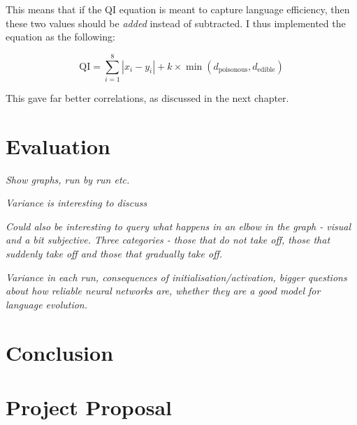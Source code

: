 \documentclass[12pt,a4paper,twoside,openright]{report}
\begin{document}
This means that if the QI equation is meant to capture language efficiency, then these two values should be \emph{added} instead of subtracted. I thus implemented the equation as the following:

\begin{equation}
\label{equation:qibetter}
\mathrm{QI} = \sum^{8}_{i = 1} |x_i - y_i| + k \times \min (d_{\mathrm{poisonous}}, d_{\mathrm{edible}})
\end{equation}

This gave far better correlations, as discussed in the next chapter.


\chapter{Evaluation}

\emph{Show graphs, run by run etc.}

\emph{Variance is interesting to discuss}

\emph{Could also be interesting to query what happens in an elbow in the graph - visual and a bit subjective. Three categories - those that do not take off, those that suddenly take off and those that gradually take off.}

\emph{Variance in each run, consequences of initialisation/activation, bigger questions about how reliable neural networks are, whether they are a good model for language evolution. }


\chapter{Conclusion}




\appendix

\chapter{Project Proposal}


\end{document}
